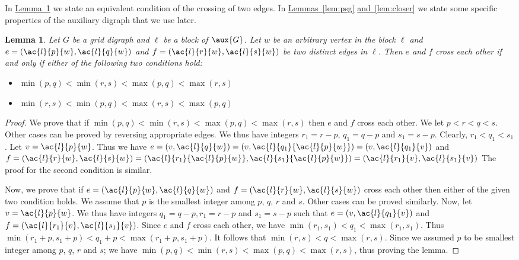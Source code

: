 \documentclass[11pt]{article}
\numberwithin{equation}{section}
\newtheorem{lemma}[theorem]{Lemma}
\theoremstyle{definition}
\theoremstyle{plain}
\newcommand{\expref}[2]{\hyperref[#2]{#1~\ref{#2}}}
\begin{document}
In \expref{Lemma}{lem:cross} we state an equivalent condition of the crossing of two edges. In \expref{Lemmas}{lem:psg} \expref{and}{lem:closer} we state some specific properties of the auxiliary 
digraph %
that we use later.


\begin{lemma}
\label{lem:cross}
Let $G$ be a grid 
digraph %
and $\ell$ be a block of $\aux{G}$. Let $w$ be an arbitrary vertex in the block $\ell$ and $e = (\ac{l}{p}{w}, \ac{l}{q}{w})$ and $f = (\ac{l}{r}{w}, \ac{l}{s}{w})$ be two distinct edges in $\ell$. Then $e$ and $f$ cross each other if and only if either of the following two conditions hold:
\begin{itemize}
\item $\min(p, q) < \min(r, s) < \max(p, q) < \max(r,s)$
\item $\min(r, s) < \min(p, q) < \max(r, s) < \max(p,q)$
\end{itemize}
\end{lemma}

\begin{proof}
We prove that if $\min(p, q) < \min(r, s) < \max(p, q) < \max(r,s)$ then $e$ and $f$ cross each other. We let $p < r < q < s$. Other cases can be proved by reversing appropriate edges. We thus have integers $r_1 = r - p$, $q_1 = q - p$ and $s_1 = s - p$. Clearly, $r_1 < q_1 < s_1$. Let $v = \ac{l}{p}{w}$. Thus we have $e = (v, \ac{l}{q}{w}) = (v, \ac{l}{q_1}{\ac{l}{p}{w}}) = (v, \ac{l}{q_1}{v})$ and $f = (\ac{l}{r}{w}, \ac{l}{s}{w}) = (\ac{l}{r_1}{\ac{l}{p}{w}}, \ac{l}{s_1}{\ac{l}{p}{w}}) = (\ac{l}{r_1}{v}, \ac{l}{s_1}{v})$
The proof for the second condition is similar.

Now, we prove that if $e = (\ac{l}{p}{w}, \ac{l}{q}{w})$ and $f = (\ac{l}{r}{w}, \ac{l}{s}{w})$ cross each other then either of the given two condition holds. We assume that $p$ is the smallest integer among $p$, $q$, $r$ and $s$. Other cases can be proved similarly. Now, let $v = \ac{l}{p}{w}$. We thus have integers $q_1 = q-p, r_1 = r-p$ and $s_1 = s-p$ such that $e = (v, \ac{l}{q_1}{v})$ and $f = (\ac{l}{r_1}{v}, \ac{l}{s_1}{v})$. Since $e$ and $f$ cross each other, we have $\min(r_1, s_1) < q_1 < \max(r_1, s_1)$. Thus $\min(r_1+p, s_1+p) < q_1+p < \max(r_1+p, s_1+p)$. It follows that $\min(r, s) < q < \max(r,s)$. Since we assumed $p$ to be smallest integer among $p$, $q$, $r$ and $s$; we have $\min(p, q) < \min(r, s) < \max(p, q) < \max(r,s)$, thus proving the lemma.
\end{proof}
\end{document}
